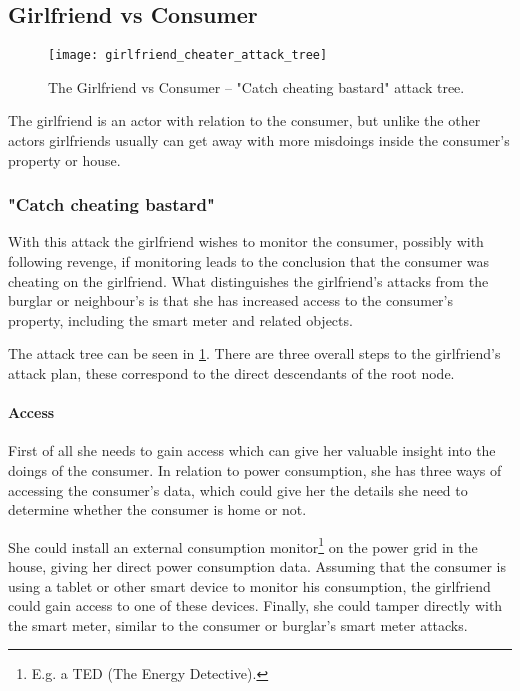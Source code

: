 \subsection{Girlfriend vs Consumer}

\begin{figure}
	\texttt{[image: girlfriend\_cheater\_attack\_tree]}
	\caption{The Girlfriend vs Consumer -- "Catch cheating bastard" attack tree.}
	\label{fig:attack_trees:girlfriend:cheater}
\end{figure}

The girlfriend is an actor with relation to the consumer, but unlike the other actors girlfriends usually can get away with more misdoings inside the consumer's property or house.

\subsubsection{"Catch cheating bastard"}

With this attack the girlfriend wishes to monitor the consumer, possibly with following revenge, if monitoring leads to the conclusion that the consumer was cheating on the girlfriend.
What distinguishes the girlfriend's attacks from the burglar or neighbour's is that she has increased access to the consumer's property, including the smart meter and related objects.

The attack tree can be seen in \cref{fig:attack_trees:girlfriend:cheater}.
There are three overall steps to the girlfriend's attack plan, these correspond to the direct descendants of the root node.

\paragraph{Access}
First of all she needs to gain access which can give her valuable insight into the doings of the consumer.
In relation to power consumption, she has three ways of accessing the consumer's data, which could give her the details she need to determine whether the consumer is home or not.

She could install an external consumption monitor\footnote{E.g. a TED (The Energy Detective).} on the power grid in the house, giving her direct power consumption data.
Assuming that the consumer is using a tablet or other smart device to monitor his consumption, the girlfriend could gain access to one of these devices.
Finally, she could tamper directly with the smart meter, similar to the consumer or burglar's smart meter attacks.

